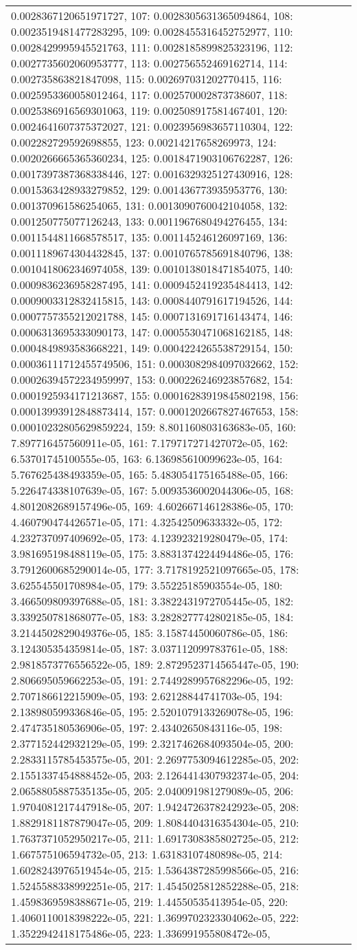 \begin{tabular}{lrl}
0.0028367120651971727, 107: 0.0028305631365094864, 108: 0.0023519481477283295, 109: 0.0028455316452752977, 110: 0.0028429995945521763, 111: 0.0028185899825323196, 112: 0.0027735602060953777, 113: 0.002756552469162714, 114: 0.002735863821847098, 115: 0.002697031202770415, 116: 0.0025953360058012464, 117: 0.002570002873738607, 118: 0.0025386916569301063, 119: 0.002508917581467401, 120: 0.0024641607375372027, 121: 0.0023956983657110304, 122: 0.002282729592698855, 123: 0.00214217658269973, 124: 0.0020266665365360234, 125: 0.0018471903106762287, 126: 0.0017397387368338446, 127: 0.0016329325127430916, 128: 0.0015363428933279852, 129: 0.001436773935953776, 130: 0.001370961586254065, 131: 0.0013090760042104058, 132: 0.001250775077126243, 133: 0.0011967680494276455, 134: 0.0011544811668578517, 135: 0.001145246126097169, 136: 0.0011189674304432845, 137: 0.0010765785691840796, 138: 0.0010418062346974058, 139: 0.0010138018471854075, 140: 0.0009836236958287495, 141: 0.0009452419235484413, 142: 0.0009003312832415815, 143: 0.0008440791617194526, 144: 0.0007757355212021788, 145: 0.0007131691716143474, 146: 0.0006313695333090173, 147: 0.0005530471068162185, 148: 0.0004849893583668221, 149: 0.0004224265538729154, 150: 0.00036111712455749506, 151: 0.0003082984097032662, 152: 0.00026394572234959997, 153: 0.000226246923857682, 154: 0.0001925934171213687, 155: 0.00016283919845802198, 156: 0.00013993912848873414, 157: 0.0001202667827467653, 158: 0.00010232805629859224, 159: 8.801160803163683e-05, 160: 7.897716457560911e-05, 161: 7.179717271427072e-05, 162: 6.53701745100555e-05, 163: 6.136985610099623e-05, 164: 5.767625438493359e-05, 165: 5.483054175165488e-05, 166: 5.226474338107639e-05, 167: 5.0093536002044306e-05, 168: 4.8012082689157496e-05, 169: 4.602667146128386e-05, 170: 4.460790474426571e-05, 171: 4.32542509633332e-05, 172: 4.232737097409692e-05, 173: 4.123923219280479e-05, 174: 3.981695198488119e-05, 175: 3.8831374224494486e-05, 176: 3.7912600685290014e-05, 177: 3.7178192521097665e-05, 178: 3.625545501708984e-05, 179: 3.55225185903554e-05, 180: 3.466509809397688e-05, 181: 3.3822431972705445e-05, 182: 3.339250781868077e-05, 183: 3.2828277742802185e-05, 184: 3.2144502829049376e-05, 185: 3.15874450060786e-05, 186: 3.124305354359814e-05, 187: 3.037112099783761e-05, 188: 2.9818573776556522e-05, 189: 2.8729523714565447e-05, 190: 2.806695059662253e-05, 191: 2.7449289957682296e-05, 192: 2.707186612215909e-05, 193: 2.62128844741703e-05, 194: 2.138980599336846e-05, 195: 2.5201079133269078e-05, 196: 2.474735180536906e-05, 197: 2.43402650843116e-05, 198: 2.377152442932129e-05, 199: 2.3217462684093504e-05, 200: 2.2833115785453575e-05, 201: 2.2697753094612285e-05, 202: 2.1551337454888452e-05, 203: 2.1264414307932374e-05, 204: 2.0658805887535135e-05, 205: 2.040091981279089e-05, 206: 1.9704081217447918e-05, 207: 1.9424726378242923e-05, 208: 1.8829181187879047e-05, 209: 1.8084404316354304e-05, 210: 1.7637371052950217e-05, 211: 1.6917308385802725e-05, 212: 1.667575106594732e-05, 213: 1.63183107480898e-05, 214: 1.6028243976519454e-05, 215: 1.5364387285998566e-05, 216: 1.5245588338992251e-05, 217: 1.4545025812852288e-05, 218: 1.4598369598388671e-05, 219: 1.44550535413954e-05, 220: 1.4060110018398222e-05, 221: 1.3699702323304062e-05, 222: 1.3522942418175486e-05, 223: 1.336991955808472e-05, 
\end{tabular}
